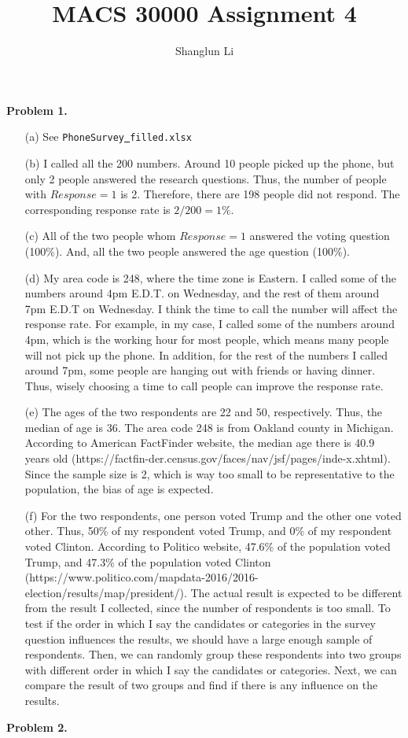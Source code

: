 \documentclass[12pt]{article}
\begin{document}
\title{MACS 30000 Assignment 4}
\author{Shanglun Li}

\maketitle 
\hfill\break
\doublespacing
{\Large \textbf{Problem 1.}}
\begin{itemize}
\item[(a)] See \texttt{PhoneSurvey\underline{ }filled.xlsx}
\item[(b)] I called all the 200 numbers. Around 10 people picked up the phone, but only 2 people answered the research questions. Thus, the number of people with $Response = 1$ is 2. Therefore, there are 198 people did not respond. The corresponding response rate is $2 / 200 = 1\%$. 
\item[(c)] All of the two people whom $Response = 1$ answered the voting question (100\%). And, all the two people answered the age question (100\%).
\item[(d)] My area code is 248, where the time zone is Eastern. I called some of the numbers around 4pm E.D.T. on Wednesday, and the rest of them around 7pm E.D.T on Wednesday. I think the time to call the number will affect the response rate. For example, in my case, I called some of the numbers around 4pm, which is the working hour for most people, which means many people will not pick up the phone. In addition, for the rest of the numbers I called around 7pm, some people are hanging out with friends or having dinner. Thus, wisely choosing a time to call people can improve the response rate.
\item[(e)] The ages of the two respondents are 22 and 50, respectively. Thus, the median of age is 36. The area code 248 is from Oakland county in Michigan. According to American FactFinder website, the median age there is 40.9 years old (https://factfin-der.census.gov/faces/nav/jsf/pages/inde-x.xhtml). Since the sample size is 2, which is way too small to be representative to the population, the bias of age is expected. 
\item[(f)] For the two respondents, one person voted Trump and the other one voted other. Thus, 50\% of my respondent voted Trump, and 0\% of my respondent voted Clinton. According to Politico website, 47.6\% of the population voted Trump, and 47.3\% of the population voted Clinton (https://www.politico.com/mapdata-2016/2016-election/results/map/president/). The actual result is expected to be different from the result I collected, since the number of respondents is too small. To test if the order in which I say the candidates or categories in the survey question influences the results, we should have a large enough sample of respondents. Then, we can randomly group these respondents into two groups with different order in which I say the candidates or categories. Next, we can compare the result of two groups and find if there is any influence on the results.
\end{itemize}
\newpage
\hfill\break
{\Large \textbf{Problem 2.}}\\
\end{document}
